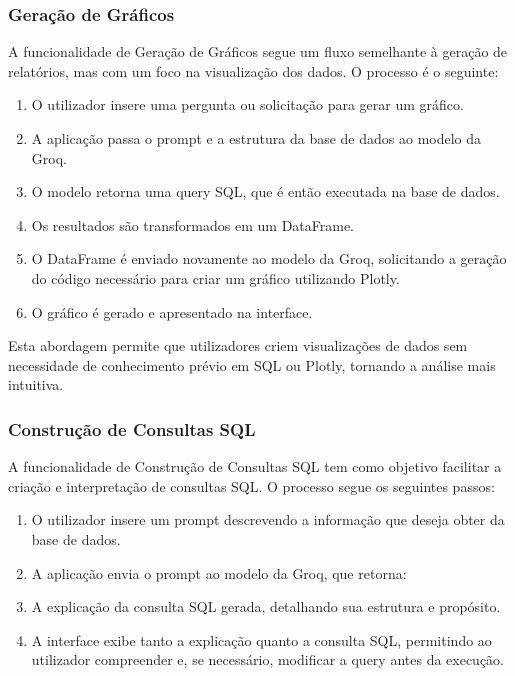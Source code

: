 \documentclass{article}
\begin{document}
\subsubsection{Geração de Gráficos}
\hspace*{1em} A funcionalidade de Geração de Gráficos segue um fluxo semelhante à geração de relatórios, mas com um foco na visualização dos dados. O processo é o seguinte:

\begin{enumerate}
    \item O utilizador insere uma pergunta ou solicitação para gerar um gráfico.
    \item A aplicação passa o prompt e a estrutura da base de dados ao modelo da Groq.
    \item O modelo retorna uma query SQL, que é então executada na base de dados.
    \item Os resultados são transformados em um DataFrame.
    \item O DataFrame é enviado novamente ao modelo da Groq, solicitando a geração do código necessário para criar um gráfico utilizando Plotly.
    \item O gráfico é gerado e apresentado na interface.
\end{enumerate}

Esta abordagem permite que utilizadores criem visualizações de dados sem necessidade de conhecimento prévio em SQL ou Plotly, tornando a análise mais intuitiva.


\subsubsection{Construção de Consultas SQL}

\hspace*{1em} A funcionalidade de Construção de Consultas SQL tem como objetivo facilitar a criação e interpretação de consultas SQL. O processo segue os seguintes passos:

\begin{enumerate}
    \item O utilizador insere um prompt descrevendo a informação que deseja obter da base de dados.
    \item A aplicação envia o prompt ao modelo da Groq, que retorna:
    \item A explicação da consulta SQL gerada, detalhando sua estrutura e propósito.
    \item A interface exibe tanto a explicação quanto a consulta SQL, permitindo ao utilizador compreender e, se necessário, modificar a query antes da execução.
\end{enumerate}
\end{document}
